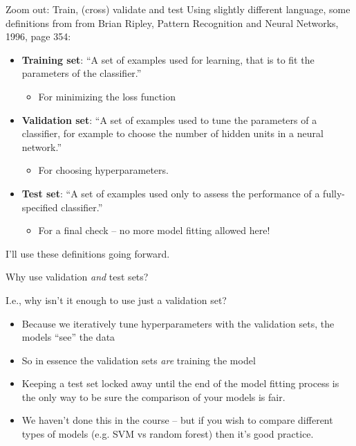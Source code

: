 \documentclass[mathserif, aspectratio=169]{beamer}
\begin{document}
\begin{frame}{Zoom out: Train, (cross) validate and test}
	Using slightly different language, some definitions from from Brian Ripley, Pattern Recognition and Neural Networks, 1996, page 354:
	\vspace{5mm}
	\begin{itemize} 
		\item \textbf{Training set}: ``A set of examples used for learning, that is to fit the parameters of the classifier.''
		\begin{itemize}
			\item<2->{For minimizing the loss function}
		\end{itemize}
		\item\textbf{ Validation set}: ``A set of examples used to tune the parameters of a classifier, for example to choose the number of hidden units in a neural network.''
		\begin{itemize}
			\item<3-> For choosing hyperparameters.
		\end{itemize}
		\item \textbf{Test set}: ``A set of examples used only to assess the performance of a fully-specified classifier.''
		\begin{itemize}
			\item<4->For a final check -- no more model fitting allowed here!
		\end{itemize}
	\end{itemize}
	\vspace{5mm}
	I'll use these definitions going forward.  
\end{frame}

\begin{frame}{Why use validation \textit{and} test sets?}

I.e., why isn't it enough to use just a validation set? \pause
	\begin{itemize}
		\item Because we iteratively tune hyperparameters with the validation sets, the models ``see'' the data
		\item So in essence the validation sets \textit{are} training the model
		\item Keeping a test set locked away until the end of the model fitting process is the only way to be sure the comparison of your models is fair.
		\item We haven't done this in the course -- but if you wish to compare different types of models (e.g. SVM vs random forest) then it's good practice.
	\end{itemize}
\end{frame}
\end{document}
